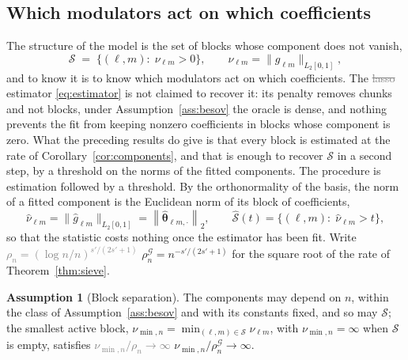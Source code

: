 \documentclass[12pt]{article} %
\theoremstyle{definition}
\newtheorem{assumption}{Assumption}
\theoremstyle{plain}
\newcommand{\norm}[1]{\left\lVert #1 \right\rVert}
\newcommand{\cv}{\ell}
\newcommand{\md}{m}
\newcommand{\gcomp}[2]{g_{#1#2}}
\newcommand{\btheta}{\boldsymbol{\theta}}
\newcommand{\thetahat}{\widehat{\btheta}}
\newcommand{\seff}{s'}
\newcommand{\rhoG}{\rho^{\mathcal{G}}_{n}}
\begin{document}
{\color{colR1}
\subsection{Which modulators act on which coefficients}
\label{sec:selection}

The structure of the model is the set of blocks whose component does not
vanish,
\[
  \mathcal{S} \;=\; \bigl\{(\cv,\md) :\; \nu_{\cv\md} > 0\bigr\},
  \qquad
  \nu_{\cv\md} = \bigl\lVert \gcomp{\cv}{\md} \bigr\rVert_{L_2[0,1]},
\]
and to know it is to know which modulators act on which coefficients. The
\textcolor{gray}{\sout{lasso}} estimator \eqref{eq:estimator} is not claimed to recover it: its
penalty removes chunks and not blocks, under Assumption~\ref{ass:besov} the
oracle is dense, and nothing prevents the fit from keeping nonzero
coefficients in blocks whose component is zero. What the preceding results do give is that every block is
estimated at the rate of Corollary~\ref{cor:components}, and that is enough to
recover $\mathcal{S}$ in a second step, by a threshold on the norms of the fitted
components. The procedure is estimation followed by a threshold. By the
orthonormality of the basis, the norm of a fitted component is the Euclidean
norm of its block of coefficients,
\[
  \widehat{\nu}_{\cv\md}
  = \bigl\lVert \widehat{g}_{\cv\md} \bigr\rVert_{L_2[0,1]}
  = \norm{\thetahat_{\cv\md,\cdot}}_{2},
  \qquad
  \widehat{\mathcal{S}}(t) = \bigl\{(\cv,\md) :\; \widehat{\nu}_{\cv\md} > t\bigr\},
\]
so that the statistic costs nothing once the estimator has been fit. Write
\textcolor{gray}{\sout{$\rho_n = (\log n/n)^{\seff/(2\seff+1)}$}} $\rhoG = n^{-\seff/(2\seff+1)}$ for the square root of the rate of
Theorem~\ref{thm:sieve}.

\begin{assumption}[Block separation]
\label{ass:sep}
The components may depend on $n$, within the class of
Assumption~\ref{ass:besov} and with its constants fixed, and so may $\mathcal{S}$; the
smallest active block, $\nu_{\min,n} = \min_{(\cv,\md)\in \mathcal{S}} \nu_{\cv\md}$, with
$\nu_{\min,n} = \infty$ when $\mathcal{S}$ is empty, satisfies \textcolor{gray}{\sout{$\nu_{\min,n}/\rho_n \to \infty$}} $\nu_{\min,n}/\rhoG \to \infty$.
\end{assumption}

}
\end{document}
